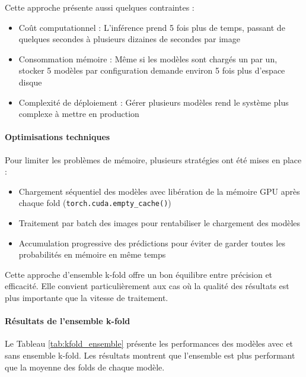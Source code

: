 Cette approche présente aussi quelques contraintes :

\begin{itemize}
    \item Coût computationnel : L'inférence prend 5 fois plus de temps, passant de quelques secondes à plusieurs dizaines de secondes par image
    \item Consommation mémoire : Même si les modèles sont chargés un par un, stocker 5 modèles par configuration demande environ 5 fois plus d'espace disque
    \item Complexité de déploiement : Gérer plusieurs modèles rend le système plus complexe à mettre en production
\end{itemize}

\paragraph{Optimisations techniques}

Pour limiter les problèmes de mémoire, plusieurs stratégies ont été mises en place :

\begin{itemize}
    \item Chargement séquentiel des modèles avec libération de la mémoire GPU après chaque fold (\texttt{torch.cuda.empty\_cache()})
    \item Traitement par batch des images pour rentabiliser le chargement des modèles
    \item Accumulation progressive des prédictions pour éviter de garder toutes les probabilités en mémoire en même temps
\end{itemize}

Cette approche d'ensemble k-fold offre un bon équilibre entre précision et efficacité. Elle convient particulièrement aux cas où la qualité des résultats est plus importante que la vitesse de traitement.

\paragraph{Résultats de l'ensemble k-fold}

Le Tableau \ref{tab:kfold_ensemble} présente les performances des modèles avec et sans ensemble k-fold. Les résultats montrent que l'ensemble est plus performant que la moyenne des folds de chaque modèle.

